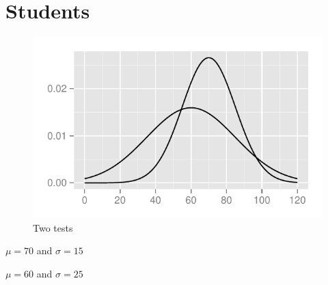 \documentclass[landscape]{exam}
\begin{document}



  \section{Students}
  \begin{figure}[H]
    \centering
    \includegraphics[scale = 0.9]{figures/two_tests.pdf}
    \caption{Two tests}
  \end{figure}

  \begin{itemize*}
    \item $\mu = 70$ and $\sigma = 15$
    \item $\mu = 60$ and $\sigma = 25$
  \end{itemize*}
\end{document}
